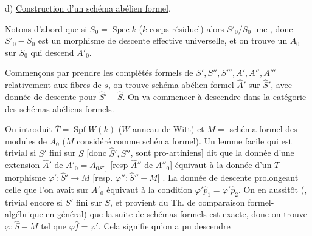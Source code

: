 d) \uline{Construction d'un schéma abélien formel}.

Notons d'abord que si $S_0=\operatorname{Spec}k$ ($k$ corps résiduel) alors $S'_0/S_0$  une , donc $S'_0\mathbin{-}S_0$ est un morphisme de descente effective universelle, et on trouve un $A_0$ sur $S_0$ qui descend $A'_0$.

Commençons par prendre les complétés formels de $S',S'',S''',A',A'',A'''$  relativement aux fibres de $s$, on trouve  schéma abélien formel $\widehat A'$ sur $\widehat S'$, avec donnée de descente pour $\widehat S'\mathbin{-}\widehat S$. On va commencer à descendre dans la catégorie des schémas abéliens formels.

On introduit $\overline T=\operatorname{Spf}W(k)$ ($W$ anneau de Witt) et $M=$ schéma formel des modules de $A_0$ ($M$ considéré comme schéma formel). Un lemme facile qui est  trivial si $S'$ fini sur $S$ [donc $\widehat S',\widehat S''$,  sont pro-artiniens] dit que la donnée d'une extension  $\widehat A'$ de $A'_0=A_{0S'_0}$ [resp $\widehat A''$ de $A''_0$] équivaut à la donnée d'un $\overline T$-morphisme $\varphi':\widehat S'\longrightarrow M$ [resp. $\varphi'':\widehat S''\mathbin{-}M$] \deleted{\unsure{resp.} $\widehat S'''\mathbin{-}M$]}.
La donnée de descente  prolongeant celle que l'on avait sur $A'_0$ équivaut à la condition $\varphi'\widehat p_1=\varphi'\widehat p_2$. On en  aussitôt (, trivial encore si $S'$ fini sur $S$, et provient du Th. de comparaison formel-algébrique en général) que la suite
de schémas formels est exacte, donc on trouve $\varphi:\widehat S\mathbin{-}M$ tel que $\varphi\widehat f=\varphi'$. Cela signifie qu'on a pu descendre
